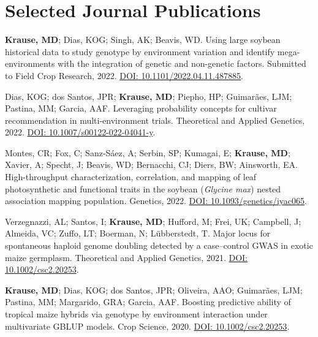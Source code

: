 \documentclass[]{deedy-resume-openfont}
\begin{document}
\begin{minipage}[t]{1\textwidth} 


\section{Selected Journal Publications} 

\sectionsep
\textbf{Krause, MD}; Dias, KOG; Singh, AK; Beavis, WD. Using large soybean historical data to study genotype by environment variation and identify mega-environments with the integration of genetic and non-genetic factors. Submitted to Field Crop Research, 2022. \href{https://www.biorxiv.org/content/10.1101/2022.04.11.487885v3.abstract}{DOI: 10.1101/2022.04.11.487885}. \ExternalLink

\sectionsep
Dias, KOG; dos Santos, JPR; \textbf{Krause, MD}; Piepho, HP; Guimarães, LJM; Pastina, MM; Garcia, AAF. Leveraging probability concepts for cultivar recommendation in multi-environment trials. Theoretical and Applied Genetics, 2022. \href{https://link.springer.com/article/10.1007/s00122-022-04041-y}{DOI: 10.1007/s00122-022-04041-y}. \ExternalLink 

\sectionsep
Montes, CR; Fox, C; Sanz-Sáez, A; Serbin, SP; Kumagai, E; \textbf{Krause, MD}; Xavier, A; Specht, J; Beavis, WD; Bernacchi, CJ; Diers, BW; Ainsworth, EA. High-throughput characterization, correlation, and mapping of leaf photosynthetic and functional traits in the soybean (\textit{Glycine max}) nested association mapping population. Genetics, 2022. \href{https://academic.oup.com/genetics/advance-article/doi/10.1093/genetics/iyac065/6572345?login=true}{DOI: 10.1093/genetics/iyac065}. \ExternalLink

\sectionsep
Verzegnazzi, AL; Santos, I; \textbf{Krause, MD}; Hufford, M; Frei, UK; Campbell, J; Almeida, VC; Zuffo, LT; Boerman, N; Lübberstedt, T. Major locus for spontaneous haploid genome doubling detected by a case–control GWAS in exotic maize germplasm. Theoretical and Applied Genetics, 2021. \href{https://link.springer.com/article/10.1007/s00122-021-03780-8}{DOI: 10.1002/csc2.20253}. \ExternalLink 

\sectionsep
\textbf{Krause, MD}; Dias, KOG; dos Santos, JPR; Oliveira, AAO; Guimarães, LJM; Pastina, MM; Margarido, GRA; Garcia, AAF. Boosting predictive ability of tropical maize hybrids via genotype by environment interaction under multivariate GBLUP models. Crop Science, 2020. \href{https://acsess.onlinelibrary.wiley.com/doi/full/10.1002/csc2.20253}{DOI: 10.1002/csc2.20253}. \ExternalLink 


\end{minipage}
\end{document}
